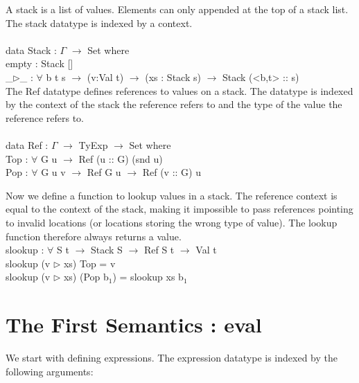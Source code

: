 \documentclass[paper=a4, fontsize=11pt]{scrartcl} %
\numberwithin{equation}{section} %
\numberwithin{figure}{section} %
\numberwithin{table}{section} %
\begin{document}
\normalfont
A stack is a list of values. Elements can only appended at the top of a stack list. The stack datatype is indexed by a context.\\
\ttfamily
\\
data Stack : $\Gamma$ $\rightarrow$ Set where\\
\hspace*{5mm}empty : Stack []\\
\hspace*{5mm}\_$\rhd$\_ : $\forall$ {b t s} $\rightarrow$ (v:Val t) $\rightarrow$ (xs : Stack s) $\rightarrow$ Stack (<b,t> :: s)\\
  
\normalfont
The \ttfamily Ref \normalfont datatype defines references to values on a stack. The datatype is indexed by the context of the stack the reference refers to and the type of the value the reference refers to.\\
\ttfamily
\\
data Ref : $\Gamma$ $\rightarrow$ TyExp $\rightarrow$ Set where\\
\hspace*{5mm}Top : $\forall$ {G u} $\rightarrow$ Ref (u :: G) (snd u)\\
\hspace*{5mm}Pop : $\forall$ {G u v} $\rightarrow$ Ref G u $\rightarrow$ Ref (v :: G) u\\
\normalfont

Now we define a function to lookup values in a stack. The reference context is equal to the context of the stack, making it impossible to pass references pointing to invalid locations (or locations storing the wrong type of value). The lookup function therefore always returns a value.\\

\ttfamily
slookup : $\forall$ {S t} $\rightarrow$ Stack S $\rightarrow$ Ref S t $\rightarrow$ Val t\\
slookup (v $\rhd$ xs) Top = v\\
slookup (v $\rhd$ xs) (Pop b$_1$) = slookup xs b$_1$\\

\normalfont

\section{The First Semantics : eval}

We start with defining expressions. The expression datatype is indexed by the following arguments: 
\end{document}

